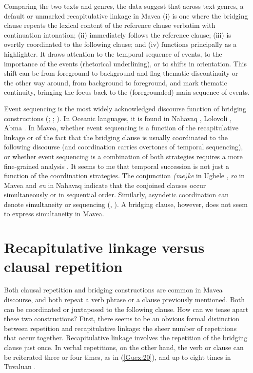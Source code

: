 \documentclass[output=paper]{LSP/langsci}
\begin{document}
Comparing the two texts and genres, the data suggest that across text genres, a default or unmarked recapitulative linkage in Mavea (i) is one where the bridging clause repeats the lexical content of the reference clause verbatim with continuation intonation; (ii) immediately follows the reference clause; (iii) is overtly coordinated to the following clause; and (iv) functions principally as a highlighter. It draws attention to the temporal sequence of events, to the importance of the events (rhetorical underlining), or to shifts in orientation. This shift can be from foreground to background and flag thematic discontinuity or the other way around, from background to foreground, and mark thematic continuity, bringing the focus back to the (foregrounded) main sequence of events. 

Event sequencing is the most widely acknowledged discourse function of bridging constructions (\citealt[][130, 242, 261]{hasan76};  \citealt[][370]{devries.2005}; \citealt[][273]{Thompson.et.al.2007}). In Oceanic languages, it is found in Nahavaq \citep[][259]{dimock09}, Lolovoli \citep[427]{hyslop01}, Abma \citep[24--26]{Schneider09}. In Mavea, whether event sequencing is a function of the recapitulative linkage or of the fact that the bridging clause is usually coordinated to the following discourse (and coordination carries overtones of temporal sequencing), or whether event sequencing is a combination of both strategies requires a more fine-grained analysis \citep[see also][325]{guerin11}. It seems to me that temporal succession is not just a function of the coordination strategies. The conjunction \textit{(me)ke} in Ughele \citep[][242]{Frostad2012}, \textit{ro} in Mavea \citep[][322]{guerin11} and \textit{en} in Nahavaq \citep[][230--231]{dimock09} indicate that the conjoined clauses occur simultaneously or in sequential order. Similarly, asyndetic coordination can denote simultaneity or sequencing (\citealt[][241]{Frostad2012}, \citealt[][425--426]{hyslop01}). A bridging clause, however, does not seem to express simultaneity in Mavea. 


\section{Recapitulative linkage versus clausal repetition}
\label{Gurepetition}
Both clausal repetition and bridging constructions are common in Mavea discourse, and both repeat a verb phrase or a clause previously mentioned. Both can be coordinated or juxtaposed to the following clause. How can we tease apart these two constructions?  First, there seems to be an obvious formal distinction between repetition and recapitulative linkage: the sheer number of repetitions that occur together. Recapitulative linkage involves the repetition of the bridging clause just once. In verbal repetitions, on the other hand, the verb or clause can be reiterated three or four times, as in (\ref{Guex:20}), and up to eight times in Tuvaluan \citep[][487]{besnier00}.
\end{document}
